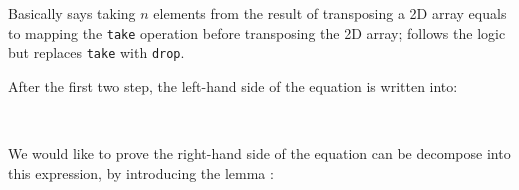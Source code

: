 \documentclass{l4proj}
\begin{document}
Basically  says taking $n$ elements from the result of transposing a 2D array equals to mapping the \texttt{take} operation before transposing the 2D array;  follows the logic but replaces \texttt{take} with \texttt{drop}.

After the first two step, the left-hand side of the equation is written into:
\begin{code}
\>[4]\AgdaSpace{}%
\AgdaSymbol{(}\AgdaSpace{}%
\AgdaSymbol{(}\AgdaSpace{}%
\AgdaSymbol{)}\AgdaSpace{}%
\AgdaSymbol{)}\AgdaSpace{}%
\<%
\\
%
\>[4]\AgdaSpace{}%
\AgdaSpace{}%
\AgdaSymbol{(}\AgdaSpace{}%
\AgdaSymbol{(}\AgdaSpace{}%
\AgdaSymbol{(}\AgdaSpace{}%
\AgdaSymbol{)}\AgdaSpace{}%
\AgdaSymbol{(}\AgdaSpace{}%
\AgdaSymbol{(}\AgdaSpace{}%
\AgdaSymbol{)}\AgdaSpace{}%
\AgdaSymbol{)))}\<%
\end{code}
We would like to prove the right-hand side of the equation can be decompose into this expression, by introducing the lemma :
\end{document}
